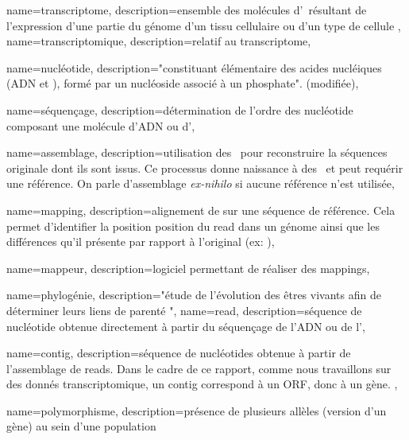  {
    name=transcriptome,
    description={ensemble des molécules d'\ARN résultant de l'expression d'une partie du génome d'un tissu cellulaire ou d'un type de cellule \cite{LeDico}},
}
 {
    name=transcriptomique,
    description={relatif au \gls{transcriptome}},
}

 {
    name=nucléotide,
    description={"constituant élémentaire des acides nucléiques (ADN et \ARN), formé par un nucléoside associé à un phosphate". \cite{Robert} (modifiée)},
}


 {
    name=séquençage,
    description={détermination de l'ordre des \gls{nucléotide} composant une molécule d'ADN ou d'\ARN},
}

 {
    name=assemblage,
    description={utilisation des \reads pour reconstruire la séquences originale dont ils sont issus. Ce processus donne naissance à des \contigs et peut requérir une référence. On parle d'assemblage \textit{ex-nihilo} si aucune référence n'est utilisée},
}

 {
    name=mapping,
    description={alignement de \reads sur une séquence de référence. Cela permet d'identifier la position position du \gls{read} dans un génome ainsi que les différences qu'il présente par rapport à l'original (ex: \SNP)},
}

 {
    name=mappeur,
    description={logiciel permettant de réaliser des \glspl{mapping}},
}

 {
    name=phylogénie,
    description={"étude de l’évolution des êtres vivants afin de déterminer leurs liens de parenté \cite{LeDico}"},
}
 {
    name=read,
    description={séquence de \gls{nucléotide} obtenue directement à partir du \gls{séquençage} de l'ADN ou de l'\ARN},
}
\newcommand{\reads}{\glspl{read}}

 {
    name=contig,
    description={séquence de \glspl{nucléotide} obtenue à partir de l'\gls{assemblage} de \reads. Dans le cadre de ce rapport, comme nous travaillons sur des donnés \gls{transcriptomique}, un \gls{contig} correspond à un \acrfull{ORF}, donc à un gène.  },
}
\newcommand{\contig}{\gls{contig}}
\newcommand{\contigs}{\glspl{contig}}

 {
    name=polymorphisme,
    description={présence de plusieurs allèles (version d'un gène) au sein d'une population}
}


